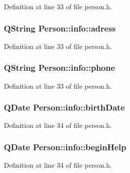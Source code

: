 Definition at line 33 of file person.\+h.

\hypertarget{struct_person_1_1info_a9842940ff9863d4643bedb4c1c3a66bb}{
\subsubsection[{adress}]{\setlength{\rightskip}{0pt plus 5cm}Q\+String Person\+::info\+::adress}}\label{struct_person_1_1info_a9842940ff9863d4643bedb4c1c3a66bb}


Definition at line 33 of file person.\+h.

\hypertarget{struct_person_1_1info_a410d9f283db98b67f3110be9080767a5}{
\subsubsection[{phone}]{\setlength{\rightskip}{0pt plus 5cm}Q\+String Person\+::info\+::phone}}\label{struct_person_1_1info_a410d9f283db98b67f3110be9080767a5}


Definition at line 33 of file person.\+h.

\hypertarget{struct_person_1_1info_ae35b9afac92191fa90ba28dce704c4de}{
\subsubsection[{birth\+Date}]{\setlength{\rightskip}{0pt plus 5cm}Q\+Date Person\+::info\+::birth\+Date}}\label{struct_person_1_1info_ae35b9afac92191fa90ba28dce704c4de}


Definition at line 34 of file person.\+h.

\hypertarget{struct_person_1_1info_a77c4910695598cdba10e16081b858860}{
\subsubsection[{begin\+Help}]{\setlength{\rightskip}{0pt plus 5cm}Q\+Date Person\+::info\+::begin\+Help}}\label{struct_person_1_1info_a77c4910695598cdba10e16081b858860}


Definition at line 34 of file person.\+h.

